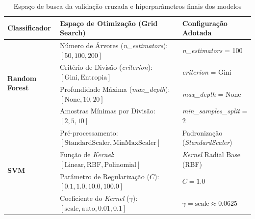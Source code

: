 \begin{table}[htbp]
    \centering
    \caption{Espaço de busca da validação cruzada e hiperparâmetros finais dos modelos}
    \label{tab:hiperparametros}
    \begin{tabular}{lll}
        \toprule
        \textbf{Classificador} & \textbf{Espaço de Otimização (Grid Search)} & \textbf{Configuração Adotada} \\
        \midrule
        \multirow{4}{*}{\textbf{Random Forest}} 
        & Número de Árvores (\textit{n\_estimators}): $[50, 100, 200]$ & \textit{n\_estimators} = \num{100} \\
        & Critério de Divisão (\textit{criterion}): $[\text{Gini}, \text{Entropia}]$ & \textit{criterion} = Gini \\
        & Profundidade Máxima (\textit{max\_depth}): $[\text{None}, 10, 20]$ & \textit{max\_depth} = None \\
        & Amostras Mínimas por Divisão: $[2, 5, 10]$ & \textit{min\_samples\_split} = \num{2} \\
        \midrule
        \multirow{4}{*}{\textbf{SVM}} 
        & Pré-processamento: $[\text{StandardScaler}, \text{MinMaxScaler}]$ & Padronização (\textit{StandardScaler}) \\
        & Função de \textit{Kernel}: $[\text{Linear}, \text{RBF}, \text{Polinomial}]$ & \textit{Kernel} Radial Base (RBF) \\
        & Parâmetro de Regularização ($C$): $[0.1, 1.0, 10.0, 100.0]$ & $C = 1.0$ \\
        & Coeficiente do \textit{Kernel} ($\gamma$): $[\text{scale}, \text{auto}, 0.01, 0.1]$ & $\gamma = \text{scale} \approx 0.0625$ \\
        \bottomrule
    \end{tabular}
\end{table}
